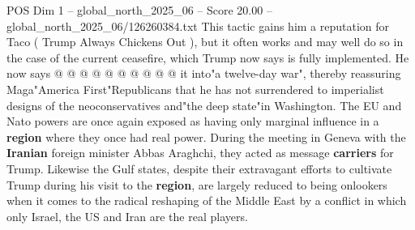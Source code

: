 \begin{textsample}{POS Dim 1 – global\_north\_2025\_06 – Score 20.00 – global\_north\_2025\_06/126260384.txt}
This tactic gains him a reputation for Taco ( Trump Always Chickens Out ), but it often works and may well do so in the case of the current ceasefire, which Trump now says is fully implemented.
He now says @ @ @ @ @ @ @ @ @ @ it into"a twelve-day war", thereby reassuring Maga"America First"Republicans that he has not surrendered to imperialist designs of the neoconservatives and"the deep state"in Washington.
The EU and Nato powers are once again exposed as having only marginal influence in a \textbf{region} where they once had real power.
During the meeting in Geneva with the \textbf{Iranian} foreign minister Abbas Araghchi, they acted as message \textbf{carriers} for Trump.
Likewise the Gulf states, despite their extravagant efforts to cultivate Trump during his visit to the \textbf{region}, are largely reduced to being onlookers when it comes to the radical reshaping of the Middle East by a conflict in which only Israel, the US and Iran are the real players.

\end{textsample}

